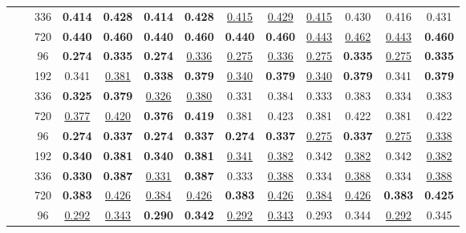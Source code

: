 \begin{table*}[!ht]
{\begin{tabular}{c|c|c|cc|cc|cc|cc|cc}
    		 & & 336 &  \textbf{0.414} & \textbf{0.428} &  \textbf{0.414} & \textbf{0.428} &  \underline{0.415} & \underline{0.429} &  \underline{0.415} & 0.430 &  0.416 & 0.431 \\
    		 & & 720 &  \textbf{0.440} & \textbf{0.460} &  \textbf{0.440} & \textbf{0.460} &  \textbf{0.440} & \textbf{0.460} &  \underline{0.443} & \underline{0.462} &  \underline{0.443} & \textbf{0.460} \\
    	\midrule
    	\multirow{8}{*}{\rotatebox[origin=c]{90}{\text{ETTh2}}}
    	& \multirow{4}{*}{\rotatebox[origin=c]{90}{\text{336}}}
    		 & 96 &  \textbf{0.274} & \textbf{0.335} &  \textbf{0.274} & \underline{0.336} &  \underline{0.275} & \underline{0.336} &  \underline{0.275} & \textbf{0.335} &  \underline{0.275} & \textbf{0.335} \\
    		 & & 192 &  0.341 & \underline{0.381} &  \textbf{0.338} & \textbf{0.379} &  \underline{0.340} & \textbf{0.379} &  \underline{0.340} & \textbf{0.379} &  0.341 & \textbf{0.379} \\
    		 & & 336 &  \textbf{0.325} & \textbf{0.379} &  \underline{0.326} & \underline{0.380} &  0.331 & 0.384 &  0.333 & 0.383 &  0.334 & 0.383 \\
    		 & & 720 &  \underline{0.377} & \underline{0.420} &  \textbf{0.376} & \textbf{0.419} &  0.381 & 0.423 &  0.381 & 0.422 &  0.381 & 0.422 \\ \cmidrule{2-13}
    	& \multirow{4}{*}{\rotatebox[origin=c]{90}{\text{512}}}
    		 & 96 &  \textbf{0.274} & \textbf{0.337} &  \textbf{0.274} & \textbf{0.337} &  \textbf{0.274} & \textbf{0.337} &  \underline{0.275} & \textbf{0.337} &  \underline{0.275} & \underline{0.338} \\
    		 & & 192 &  \textbf{0.340} & \textbf{0.381} &  \textbf{0.340} & \textbf{0.381} &  \underline{0.341} & \underline{0.382} &  0.342 & \underline{0.382} &  0.342 & \underline{0.382} \\
    		 & & 336 &  \textbf{0.330} & \textbf{0.387} &  \underline{0.331} & \textbf{0.387} &  0.333 & \underline{0.388} &  0.334 & \underline{0.388} &  0.334 & \underline{0.388} \\
    		 & & 720 &  \textbf{0.383} & \underline{0.426} &  \underline{0.384} & \underline{0.426} &  \textbf{0.383} & \underline{0.426} &  \underline{0.384} & \underline{0.426} &  \textbf{0.383} & \textbf{0.425} \\
    	\midrule
    	\multirow{8}{*}{\rotatebox[origin=c]{90}{\text{ETTm1}}}
    	& \multirow{4}{*}{\rotatebox[origin=c]{90}{\text{336}}}
    		 & 96 &  \underline{0.292} & \underline{0.343} &  \textbf{0.290} & \textbf{0.342} &  \underline{0.292} & \underline{0.343} &  0.293 & 0.344 &  \underline{0.292} & 0.345 \\

\end{tabular}}
\end{table*}
